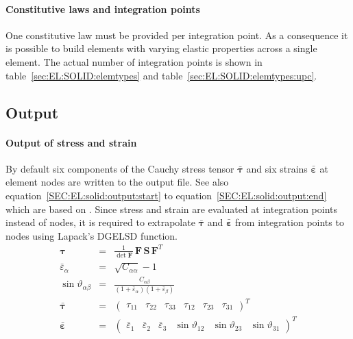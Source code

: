 \paragraph{Constitutive laws and integration points}
One constitutive law must be provided per integration point.
As a consequence it is possible to build elements with varying elastic properties across a single element.
The actual number of integration points is shown in table~\ref{sec:EL:SOLID:elemtypes} and table~\ref{sec:EL:SOLID:elemtypes:upc}.
\subsection{Output}
\paragraph{Output of stress and strain}
By default six components of the Cauchy stress tensor $\bar{\boldsymbol{\tau}}$ and six strains $\bar{\boldsymbol{\varepsilon}}$ at element nodes are written to the output file.
See also equation~\ref{SEC:EL:solid:output:start} to equation~\ref{SEC:EL:solid:output:end} which are based on \cite{WALLRAPP1998}.
Since stress and strain are evaluated at integration points instead of nodes, it is required to extrapolate $\bar{\boldsymbol{\tau}}$ and $\bar{\boldsymbol{\varepsilon}}$
from integration points to nodes using Lapack's DGELSD function.
\begin{eqnarray}
  \boldsymbol{\tau} & = & \frac{1}{\det{\boldsymbol{F}}} \, \boldsymbol{F} \, \boldsymbol{S} \, \boldsymbol{F}^T   \label{SEC:EL:solid:output:start} \\
  \bar{\varepsilon}_{\alpha} & = & \sqrt{C_{\alpha\alpha}} - 1 \\
  \sin{\vartheta_{\alpha\beta}} & = & \frac{C_{\alpha\beta}}{\left(1 + \bar{\varepsilon}_{\alpha}\right)\left(1 + \bar{\varepsilon}_{\beta}\right)}   \label{SEC:EL:solid:output:end}  \\
  \bar{\boldsymbol{\tau}} & = & \begin{pmatrix}
    \tau_{11} &
    \tau_{22} &
    \tau_{33} &
    \tau_{12} &
    \tau_{23} &
    \tau_{31}
  \end{pmatrix}^T \\
  \bar{\boldsymbol{\varepsilon}} & = & \begin{pmatrix}
    \bar{\varepsilon}_1 &
    \bar{\varepsilon}_2 &
    \bar{\varepsilon}_3 &
    \sin{\vartheta}_{12} &
    \sin{\vartheta}_{23} &
    \sin{\vartheta}_{31}
  \end{pmatrix}^T
\end{eqnarray}

